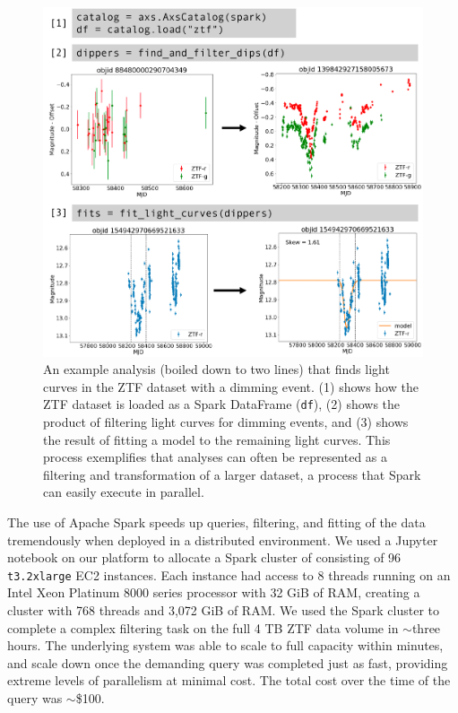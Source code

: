 \documentclass[twocolumn, linenumbers]{aastex631}
\begin{document}
\begin{figure}
    \centering
    \includegraphics[width=\linewidth]{code_and_results.pdf}
    \caption{An example analysis (boiled down to two lines) that finds light curves in the ZTF dataset with a dimming event. (1) shows how the ZTF dataset is loaded as a Spark DataFrame (\texttt{df}), (2) shows the product of filtering light curves for dimming events, and (3) shows the result of fitting a model to the remaining light curves. This process exemplifies that analyses can often be represented as a filtering and transformation of a larger dataset, a process that Spark can easily execute in parallel.}
    \label{fig:dippers}
\end{figure}

The use of Apache Spark speeds up queries, filtering, and fitting of the data tremendously when deployed in a distributed environment. We used a Jupyter notebook on our platform to allocate a Spark cluster of consisting of 96 \texttt{t3.2xlarge} EC2 instances. Each instance had access to 8 threads running on an Intel Xeon Platinum 8000 series processor with 32 GiB of RAM, creating a cluster with 768 threads and 3,072 GiB of RAM. We used the Spark cluster to complete a complex filtering task on the full 4 TB ZTF data volume in ${\sim}$three hours. The underlying system was able to scale to full capacity within minutes, and scale down once the demanding query was completed just as fast, providing extreme levels of parallelism at minimal cost. The total cost over the time of the query was ${\sim}$\$100.
\end{document}
